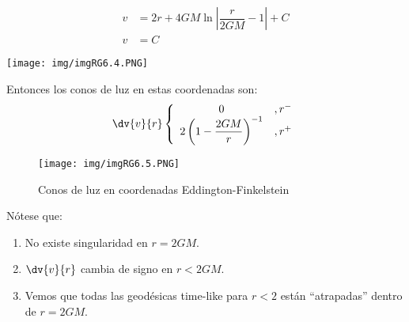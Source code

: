 \documentclass[../main]{subfiles}
\begin{document}
\begin{adjustwidth}{0pt}{-100pt}
\begin{minipage}{0.6\textwidth}
    \begin{align}
        v&=2r+4GM\ln\left|\dfrac{r}{2GM}-1\right|+C \tag{$r^+$}\\
        v&=C \tag{$r^-$}
    \end{align}
\end{minipage}
\begin{minipage}{0.5\textwidth}
    \begin{adjustwidth}{20pt}{-60pt}
    \begin{center}
        \texttt{[image: img/imgRG6.4.PNG]}
    \end{center}
    \end{adjustwidth}
\end{minipage}

Entonces los conos de luz en estas coordenadas son:
\begin{equation}
    \dv{v}{r}\left\{
    \begin{array}{cc}
        0 & ,r^-\\
        2\left(1-\dfrac{2GM}{r}\right)^{-1} & ,r^+
    \end{array}
    \right.
\end{equation}

\begin{figure}[H]
    \begin{adjustwidth}{0pt}{-100pt}
    \begin{center}
        \texttt{[image: img/imgRG6.5.PNG]}
        \caption{Conos de luz en coordenadas Eddington-Finkelstein}
    \end{center}
    \end{adjustwidth}
\end{figure}

Nótese que:
\begin{enumerate}
    \item No existe singularidad en $r=2GM$.
    \item $\dv{v}{r}$ cambia de signo en $r<2GM$.
    \item Vemos que todas las geodésicas time-like para $r<2$ están ``atrapadas'' dentro de $r=2GM$.
\end{enumerate}


\end{adjustwidth}
\end{document}
